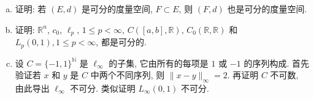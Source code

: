 \begin{exercise}
  \begin{enumerate}[(a)]
    \item 证明: 若 $(E,d)$ 是可分的度量空间, $F\subset E$,
      则 $(F,d)$ 也是可分的度量空间.
    \item 证明: $\mathbb{R}^{n}$, $c_0$, $\ell_{p}$, $1 \leq p<\infty$, $C([a, b],\mathbb{R})$,
      $C_{0}(\mathbb{R}, \mathbb{R})$ 
      和 $L_{p}(0,1), 1 \leq p<\infty$, 都是可分的.
    \item 设 $C=\{-1,1\}^{\mathbb{N}}$ 是 $\ell_{\infty}$ 的子集, 
      它由所有的每项是 $1$ 或 $-1$ 的序列构成. 首先验证若 $x$ 和 $y$ 是 $C$ 中两个不同序列, 
      则 $\|x-y\|_{\infty}=2$. 再证明 $C$ 不可数, 由此导出 $\ell_{\infty}$ 不可分.
      类似证明 $L_{\infty}(0,1)$ 不可分.
  \end{enumerate}
\end{exercise}

